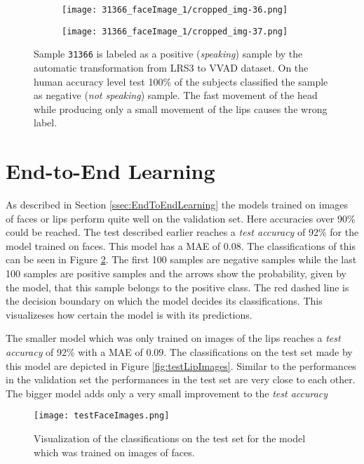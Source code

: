 \begin{figure}
{\begin{subfigure}{0.09\textwidth}
\end{subfigure}
\begin{subfigure}{0.09\textwidth}
  \centering
  \texttt{[image: 31366\_faceImage\_1/cropped\_img-36.png]}
\end{subfigure}
\begin{subfigure}{0.09\textwidth}
  \centering
  \texttt{[image: 31366\_faceImage\_1/cropped\_img-37.png]}
\end{subfigure}
}
\caption{Sample \texttt{31366} is labeled as a positive (\emph{speaking}) sample by the automatic transformation from LRS3 to VVAD dataset. On the human accuracy level test 100\% of the subjects classified the sample as negative (\emph{not speaking}) sample. The fast movement of the head while producing only a small movement of the lips causes the wrong label.}
\label{fig:31366}
\end{figure}

\section{End-to-End Learning}
As described in Section \ref{ssec:EndToEndLearning} the models trained on images of faces or lips perform quite well on the validation set.
Here accuracies over 90\% could be reached.
The test described earlier reaches a \emph{test accuracy} of 92\% 
for the model trained on faces.
This model has a MAE of $0.08$. 
The classifications of this can be seen in Figure \ref{fig:testFaceImages}.
The first 100 samples are negative samples while the last 100 samples are positive samples and the arrows show the probability, given by the model, that this sample belongs to the positive class.
The red dashed line is the decision boundary on which the model decides its classifications. 
This visualizeses how certain the model is with its predictions.

The smaller model which was only trained on images of the lips reaches a \emph{test accuracy} of 92\% with a MAE of $0.09$.
The classifications on the test set made by this model are depicted in Figure \ref{fig:testLipImages}.
Similar to the performances in the validation set the performances in the test set are very close to each other.
The bigger model adds only a very small improvement to the \emph{test accuracy}

\begin{figure}
  \centering
  \texttt{[image: testFaceImages.png]}
  \caption{Visualization of the classifications on the test set for the model which was trained on images of faces.}
  \label{fig:testFaceImages}
\end{figure}

